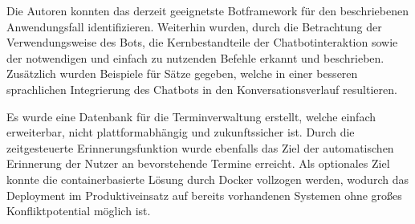 Die Autoren konnten das derzeit geeignetste Botframework für den beschriebenen Anwendungsfall identifizieren. Weiterhin wurden, durch die Betrachtung der Verwendungsweise des Bots, die Kernbestandteile der Chatbotinteraktion sowie der notwendigen und einfach zu nutzenden Befehle erkannt und beschrieben. Zusätzlich wurden Beispiele für Sätze gegeben, welche in einer besseren sprachlichen Integrierung des Chatbots in den Konversationsverlauf resultieren. 

Es wurde eine Datenbank für die Terminverwaltung erstellt, welche einfach erweiterbar, nicht plattformabhängig und zukunftssicher ist. Durch die zeitgesteuerte Erinnerungsfunktion wurde ebenfalls das Ziel der automatischen Erinnerung der Nutzer an bevorstehende Termine erreicht. Als optionales Ziel konnte die containerbasierte Lösung durch Docker vollzogen werden, wodurch das Deployment im Produktiveinsatz auf bereits vorhandenen Systemen ohne großes Konfliktpotential möglich ist.

